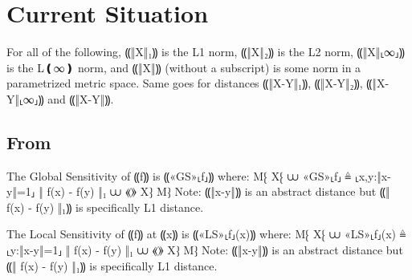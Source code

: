 \documentclass{article}
\begin{document}












\section{Current Situation}

For all of the following, ⸨‖X‖₁⸩ is the L1 norm, ⸨‖X‖₂⸩ is the L2 norm, ⸨‖X‖⸤∞⸥⸩
is the L❪∞❫ norm, and ⸨‖X‖⸩ (without a subscript) is some norm in a parametrized
metric space. Same goes for distances ⸨‖X-Y‖₁⸩, ⸨‖X-Y‖₂⸩, ⸨‖X-Y‖⸤∞⸥⸩ and
⸨‖X-Y‖⸩.

\subsection{From \cite{smooth-sensitivity}}

\begin{definition}
  The Global Sensitivity of ⸨f⸩ is ⸨«GS»⸤f⸥⸩ where:
  M⁅ X⁅ ⩊ «GS»⸤f⸥ ≜ \max\limits⸤x,y:‖x-y‖=1⸥ ‖ f(x) - f(y) ‖₁ 
        ⩊ ⟪\citep[§ 1.2, Definition 1.3]{smooth-sensitivity}⟫
     X⁆
  M⁆
  Note: ⸨‖x-y‖⸩ is an abstract distance but ⸨‖ f(x) - f(y) ‖₁⸩  is
  specifically L1 distance.
\end{definition}

\begin{definition}
  The Local Sensitivity of ⸨f⸩ at ⸨x⸩ is ⸨«LS»⸤f⸥(x)⸩ where:
  M⁅ X⁅ ⩊ «LS»⸤f⸥(x) ≜ \max\limits⸤y:‖x-y‖=1⸥ ‖ f(x) - f(y) ‖₁
        ⩊ ⟪\citep[§ 1.3, Definition 1.6]{smooth-sensitivity}⟫
     X⁆
  M⁆
  Note: ⸨‖x-y‖⸩ is an abstract distance but ⸨‖ f(x) - f(y) ‖₁⸩  is
  specifically L1 distance.
\end{definition}
\end{document}
